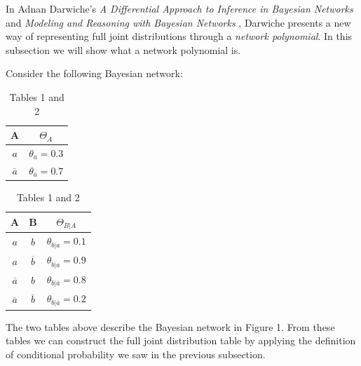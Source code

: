 \documentclass[a4paper,10pt]{article}
\theoremstyle{plain}
\begin{document}
In Adnan Darwiche's \textit{A Differential Approach to Inference in Bayesian Networks}
\cite{diff-approach-darwiche} and \textit{Modeling and Reasoning with Bayesian Networks}
\cite{bayes-net-darwiche}, Darwiche presents a new way of representing full joint distributions
through a \textit{network polynomial}. In this subsection we will show what a network polynomial
is.

Consider the following Bayesian network:

\begin{figure}[h]
\end{figure}

\begin{table}[h]
  \begin{center}
    \captionsetup{justification=centering}
    \begin{tabular}{c | c}
      A & $\Theta_A$ \\
      \hline
      $a$ & $\theta_a = 0.3$ \\
      $\overline{a}$ & $\theta_{\overline{a}} = 0.7$ \\
    \end{tabular}
    \quad
    \quad
    \begin{tabular}{c c | c}
      A & B & $\Theta_{B|A}$ \\
      \hline
      $a$ & $b$ & $\theta_{b|a}=0.1$ \\
      $a$ & $\overline{b}$ & $\theta_{\overline{b}|a}=0.9$ \\
      $\overline{a}$ & $b$ & $\theta_{b|\overline{a}}=0.8$ \\
      $\overline{a}$ & $\overline{b}$ & $\theta_{\overline{b}|\overline{a}}=0.2$ \\
    \end{tabular}
    \caption*{Tables 1 and 2}
  \end{center}
\end{table}
\setcounter{table}{2}

The two tables above describe the Bayesian network in Figure 1. From these tables we can construct
the full joint distribution table by applying the definition of conditional probability we saw in
the previous subsection.
\end{document}
